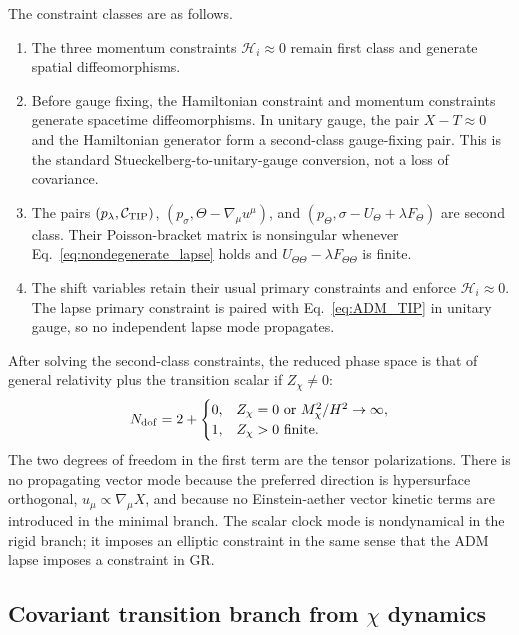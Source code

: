 \documentclass[aps,prd,reprint,nofootinbib,superscriptaddress,longbibliography]{revtex4-2}
\begin{document}
The constraint classes are as follows.
\begin{enumerate}
  \item The three momentum constraints $\mathcal H_i\approx0$ remain first class and generate spatial diffeomorphisms.
  \item Before gauge fixing, the Hamiltonian constraint and momentum constraints generate spacetime diffeomorphisms.  In unitary gauge, the pair $X-T\approx0$ and the Hamiltonian generator form a second-class gauge-fixing pair.  This is the standard Stueckelberg-to-unitary-gauge conversion, not a loss of covariance.
  \item The pairs $(p_\lambda,{\cal C}_{\rm TIP})$, $(p_\sigma,\Theta-\nabla_\mu u^\mu)$, and $(p_\Theta,\sigma-U_\Theta+\lambda F_\Theta)$ are second class.  Their Poisson-bracket matrix is nonsingular whenever Eq.~\eqref{eq:nondegenerate_lapse} holds and $U_{\Theta\Theta}-\lambda F_{\Theta\Theta}$ is finite.
  \item The shift variables retain their usual primary constraints and enforce $\mathcal H_i\approx0$.  The lapse primary constraint is paired with Eq.~\eqref{eq:ADM_TIP} in unitary gauge, so no independent lapse mode propagates.
\end{enumerate}
After solving the second-class constraints, the reduced phase space is that of general relativity plus the transition scalar if $Z_\chi\ne0$:
\begin{equation}
  N_{\rm dof}=2+\begin{cases}
  0, & Z_\chi=0\hbox{ or }M_\chi^2/H^2\to\infty,\\
  1, & Z_\chi>0\hbox{ finite}.
  \end{cases}
  \label{eq:dof_count_final}
\end{equation}
The two degrees of freedom in the first term are the tensor polarizations.  There is no propagating vector mode because the preferred direction is hypersurface orthogonal, $u_\mu\propto\nabla_\mu X$, and because no Einstein-aether vector kinetic terms are introduced in the minimal branch.  The scalar clock mode is nondynamical in the rigid branch; it imposes an elliptic constraint in the same sense that the ADM lapse imposes a constraint in GR.

\subsection{Covariant transition branch from $\chi$ dynamics}
\label{subsec:transition_chi_completion}
\end{document}
